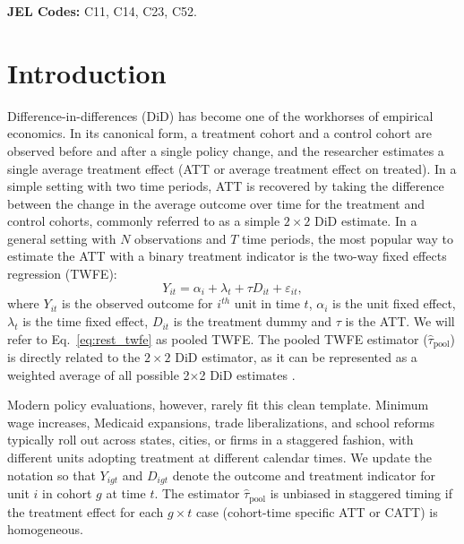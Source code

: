 \documentclass[margin=5in, 12pt]{article}
\newcommand{\1}{\mathbbm{1}}
\begin{document}
\bigskip
\noindent\textbf{JEL Codes:} C11, C14, C23, C52.

\newpage

\section{Introduction}
\label{sec:intro}

Difference-in-differences (DiD) has become one of the workhorses of empirical economics. In its canonical form, a treatment cohort and a control cohort are observed before and after a single policy change, and the researcher estimates a single average treatment effect (ATT or average treatment effect on treated). In a simple setting with two time periods, ATT is recovered by taking the difference between the change in the average outcome over time for the treatment and control cohorts, commonly referred to as a simple $2\times2$ DiD estimate. In a general setting with $N$ observations and $T$ time periods, the most popular way to estimate the ATT with a binary treatment indicator is the two-way fixed effects regression (TWFE):
\begin{equation}
\label{eq:rest_twfe}
  Y_{it} = \alpha_i + \lambda_t + \tau D_{it} + \varepsilon_{it},
\end{equation}
where $Y_{it}$ is the observed outcome for $i^{th}$ unit in time $t$, $\alpha_i$ is the unit fixed effect, $\lambda_t$ is the time fixed effect, $D_{it}$ is the treatment dummy and $\tau$ is the ATT. We will refer to Eq.~\ref{eq:rest_twfe} as pooled TWFE. The pooled TWFE estimator ($\hat\tau_{\text{pool}}$) is directly related to the $2\times 2$ DiD estimator, as it can be represented as a weighted average of all possible 2$\times$2 DiD estimates \citep{goodman2021}.


Modern policy evaluations, however, rarely fit this clean template. Minimum wage increases, Medicaid expansions, trade liberalizations, and school reforms typically roll out across states, cities, or firms in a staggered fashion, with different units adopting treatment at different calendar times. We update the notation so that $Y_{igt}$ and $D_{igt}$ denote the outcome and treatment indicator for unit $i$ in cohort $g$ at time $t$. The estimator $\hat\tau_{\text{pool}}$ is unbiased in staggered timing if the treatment effect for each $g\times t$ case (cohort-time specific ATT or CATT) is homogeneous.
\end{document}
